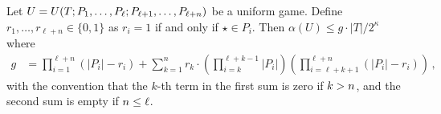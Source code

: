 \newcommand{\OneIf}[1]{\mathbf{1}_{#1}}
\newcommand{\PiNotEmpty}[1][i]{\OneIf{P_{#1} \neq \emptyset}}
\newcommand{\PiHasRandom}[1][i]{\OneIf{\star \in P_{#1}}}
\begin{theorem}
    \label{thm:xor-game-lookahead}
  Let $U = U(T; P_1, \ldots, P_\ell; P_{\ell+1}, \ldots, P_{\ell+n} )$ be a uniform game. 
  Define $r_1, \ldots, r_{\ell + n} \in \{0,1\}$ as 
  $r_i = 1$ if and only if $\star \in P_i$.
  Then $\alpha(U) \leq g \cdot|T|/2^\kappa$ where
    \begin{align}\label{eq:xor-game-lookahead-gp}
    g  
    &= 
    \prod_{i=1}^{\ell + n} (|P_i| - r_i) 
    +\sum_{k=1}^n r_k \cdot
        \left(  \prod_{i=k}^{\ell+k-1}     
                                                |P_{i}|      \right)   
        \left(  \prod_{i=\ell+k+1}^{\ell+n}     
                                                \left(|P_i| - r_i \right)
                                                                    \right)
    \,,
  \end{align}
  with the convention that 
  the $k$-th term in the first sum is zero if $k > n$, and
  the second sum is empty if $n \leq \ell$.
\end{theorem}




